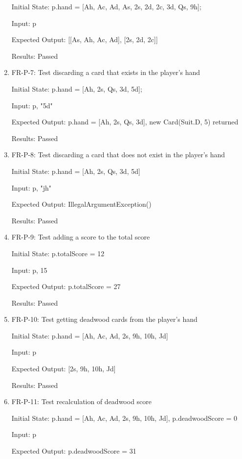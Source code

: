 \documentclass[12pt, titlepage]{article}
\begin{document}
\begin{enumerate}
    Initial State: p.hand = [Ah, Ac, Ad, As, 2s, 2d, 2c, 3d, Qs, 9h];
    
    Input: p
    
    Expected Output: [[As, Ah, Ac, Ad], [2s, 2d, 2c]]
    
    Results: Passed
    
    \item FR-P-7: Test discarding a card that exists in the player's hand
    
    Initial State: p.hand = [Ah, 2s, Qs, 3d, 5d];
    
    Input: p, "5d"
    
    Expected Output: p.hand = [Ah, 2s, Qs, 3d], new Card(Suit.D, 5) returned
    
    Results: Passed
    
    \item FR-P-8: Test discarding a card that does not exist in the player's hand
    
    Initial State: p.hand = [Ah, 2s, Qs, 3d, 5d]
    
    Input: p, "jh"
    
    Expected Output: IllegalArgumentException()
    
    Results: Passed
    
    \item FR-P-9: Test adding a score to the total score
    
    Initial State: p.totalScore = 12
    
    Input: p, 15
    
    Expected Output: p.totalScore = 27
    
    Results: Passed
    
    \item FR-P-10: Test getting deadwood cards from the player's hand
    
    Initial State: p.hand = [Ah, Ac, Ad, 2s, 9h, 10h, Jd]
    
    Input: p
    
    Expected Output: [2s, 9h, 10h, Jd]
    
    Results: Passed
    
    \item FR-P-11: Test recalculation of deadwood score
    
    Initial State: p.hand = [Ah, Ac, Ad, 2s, 9h, 10h, Jd], p.deadwoodScore = 0
    
    Input: p
    
    Expected Output: p.deadwoodScore = 31
    

\end{enumerate}
\end{document}
